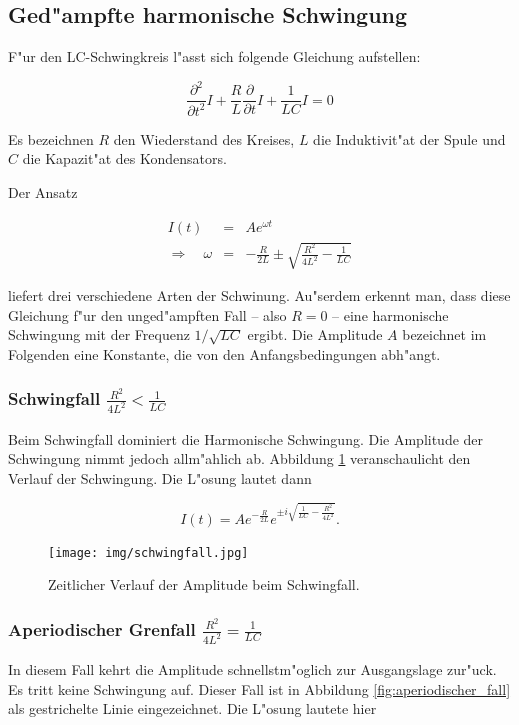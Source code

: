 	\subsection{Ged"ampfte harmonische Schwingung}

	F"ur den LC-Schwingkreis l"asst sich folgende Gleichung aufstellen:

	\begin{equation}
		\frac{\partial^2}{\partial t^2} I + \frac{R}{L} \frac{\partial}{\partial t} I + \frac{1}{LC} I = 0
	\end{equation}

	Es bezeichnen $R$ den Wiederstand des Kreises, $L$ die Induktivit"at der Spule und $C$ die Kapazit"at des Kondensators.

	Der Ansatz 

	\begin{eqnarray}
		I(t) & = & Ae^{\omega t} \nonumber \\
		\Rightarrow \quad \omega & = & - \frac{R}{2L} \pm \sqrt{\frac{R^2}{4L^2} - \frac{1}{LC}}
	\end{eqnarray}

	liefert drei verschiedene Arten der Schwinung. Au"serdem erkennt man, dass diese Gleichung f"ur den unged"ampften Fall -- also $R = 0$ -- eine harmonische Schwingung mit der Frequenz $1/\sqrt{LC}$ ergibt.
	Die Amplitude $A$ bezeichnet im Folgenden eine Konstante, die von den Anfangsbedingungen abh"angt.

	\subsubsection{Schwingfall $\frac{R^2}{4L^2} < \frac{1}{LC}$}
		Beim Schwingfall dominiert die Harmonische Schwingung.
		Die Amplitude der Schwingung nimmt jedoch allm"ahlich ab.
		Abbildung \ref{fig:schwingfall} veranschaulicht den Verlauf der Schwingung.
		Die L"osung lautet dann

		\begin{equation}
			I(t) = A e^{-\frac{R}{2L}} e^{\pm i \sqrt{\frac{1}{LC}- \frac{R^2}{4L^2}}}.
		\end{equation}

		\begin{figure}[h!]
			\centering
			\texttt{[image: img/schwingfall.jpg]}
			\caption{Zeitlicher Verlauf der Amplitude beim Schwingfall.}
			\label{fig:schwingfall}
		\end{figure}

	\subsubsection{Aperiodischer Grenfall $\frac{R^2}{4L^2} = \frac{1}{LC}$}
		In diesem Fall kehrt die Amplitude schnellstm"oglich zur Ausgangslage zur"uck.
		Es tritt keine Schwingung auf.
		Dieser Fall ist in Abbildung \ref{fig:aperiodischer_fall} als gestrichelte Linie eingezeichnet.
		Die L"osung lautete hier


